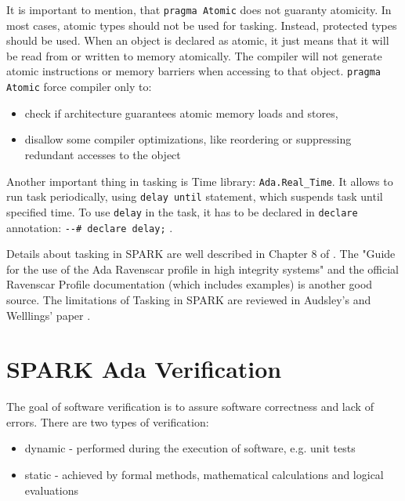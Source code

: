 It is important to mention, that \lstinline{pragma Atomic} does not guaranty atomicity. In most cases, atomic types should not be used for tasking. Instead, protected types should be used. When an object is declared as atomic, it just means that it will be read from or written to memory atomically. The compiler will not generate atomic instructions or memory barriers when accessing to that object. \lstinline{pragma Atomic} force compiler only to:
\begin{itemize}
	\item check if architecture guarantees atomic memory loads and stores,
	\item disallow some compiler optimizations, like reordering or suppressing redundant accesses to the object
\end{itemize}

Another important thing in tasking is Time library: \lstinline{Ada.Real_Time}. It allows to run task periodically, using \lstinline{delay until} statement, which suspends task until specified time. To use \lstinline{delay} in the task, it has to be declared in \lstinline{declare} annotation: \lstinline{--# declare delay;} \cite{Barnes:Book}.

Details about tasking in SPARK are well described in Chapter 8 of \cite{Barnes:Book}. The "Guide for the use of the Ada Ravenscar profile in high integrity systems" \cite{Ravenscar:Article} and the official Ravenscar Profile documentation (which includes examples) \cite{Ravenscar:Online} is another good source. The limitations of Tasking in SPARK are reviewed in Audsley's and Welllings' paper \cite{IssuesWithRavenscar:Paper}.



\section{SPARK Ada Verification}
\label{background:sparkverification}


The goal of software verification is to assure software correctness and lack of errors. There are two types of verification:
\begin{itemize}
	\item dynamic - performed during the execution of software, e.g. unit tests
	\item static - achieved by formal methods, mathematical calculations and logical evaluations
\end{itemize}

